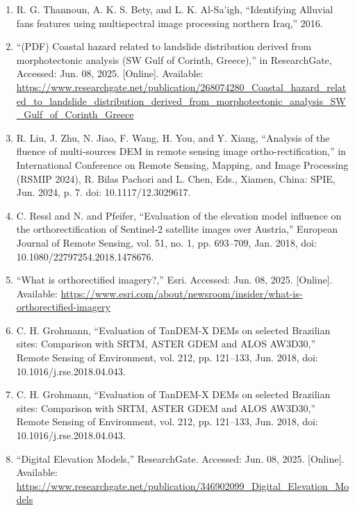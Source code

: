\documentclass{article}
\begin{document}
\begin{sloppypar}
\begin{enumerate}
    \item{R. G. Thannoun, A. K. S. Bety, and L. K. Al-Sa’igh, “Identifying Alluvial fans features using multispectral image processing northern Iraq,” 2016.}

    \item{“(PDF) Coastal hazard related to landslide distribution derived from morphotectonic analysis (SW Gulf of Corinth, Greece),” in ResearchGate, Accessed: Jun. 08, 2025. [Online]. Available: \url{https://www.researchgate.net/publication/268074280_Coastal_hazard_related_to_landslide_distribution_derived_from_morphotectonic_analysis_SW_Gulf_of_Corinth_Greece}}

    \item{R. Liu, J. Zhu, N. Jiao, F. Wang, H. You, and Y. Xiang, “Analysis of the fluence of multi-sources DEM in remote sensing image ortho-rectification,” in International Conference on Remote Sensing, Mapping, and Image  Processing (RSMIP 2024), R. Bilas Pachori and L. Chen, Eds., Xiamen, China: SPIE, Jun. 2024, p. 7. doi: 10.1117/12.3029617.}

    \item{C. Ressl and N. and Pfeifer, “Evaluation of the elevation model influence on the orthorectification of Sentinel-2 satellite images over Austria,” European Journal of Remote Sensing, vol. 51, no. 1, pp. 693–709, Jan. 2018, doi: 10.1080/22797254.2018.1478676.}

    \item{“What is orthorectified imagery?,” Esri. Accessed: Jun. 08, 2025. [Online]. Available: \url{https://www.esri.com/about/newsroom/insider/what-is-orthorectified-imagery}}

    \item{C. H. Grohmann, “Evaluation of TanDEM-X DEMs on selected Brazilian sites: Comparison with SRTM, ASTER GDEM and ALOS AW3D30,” Remote Sensing of Environment, vol. 212, pp. 121–133, Jun. 2018, doi: 10.1016/j.rse.2018.04.043.}

    \item{C. H. Grohmann, “Evaluation of TanDEM-X DEMs on selected Brazilian sites: Comparison with SRTM, ASTER GDEM and ALOS AW3D30,” Remote Sensing of Environment, vol. 212, pp. 121–133, Jun. 2018, doi: 10.1016/j.rse.2018.04.043.}

    \item{“Digital Elevation Models,” ResearchGate. Accessed: Jun. 08, 2025. [Online]. Available: \url{https://www.researchgate.net/publication/346902099_Digital_Elevation_Models}}


\end{enumerate}
\end{sloppypar}
\end{document}
